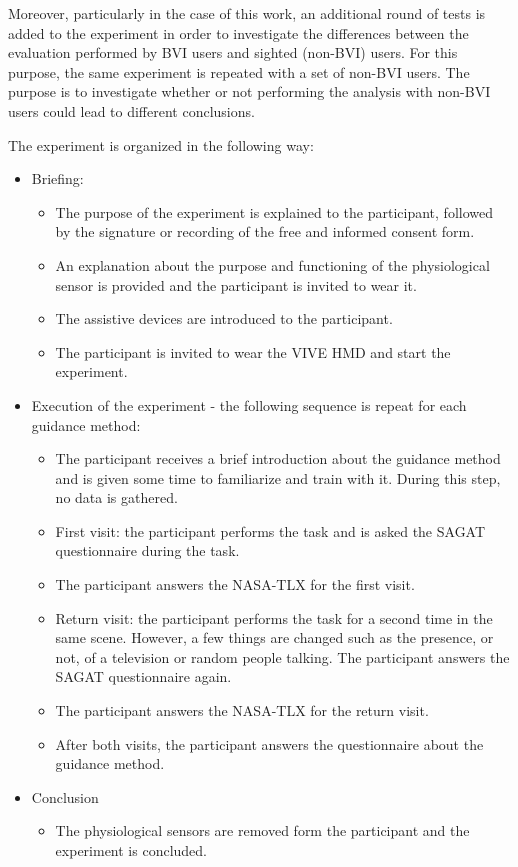 Moreover, particularly in the case of this work, an additional round of tests is added to the experiment in order to investigate the differences between the evaluation performed by BVI users and sighted (non-BVI) users. For this purpose, the same experiment is repeated with a set of non-BVI users. The purpose is to investigate whether or not performing the analysis with non-BVI users could lead to different conclusions.

The experiment is organized in the following way:

\begin{itemize}
    \item Briefing:
    \begin{itemize}
        \item The purpose of the experiment is explained to the participant, followed by the signature or recording of the free and informed consent form.
        \item An explanation about the purpose and functioning of the physiological sensor is provided and the participant is invited to wear it.
        \item The assistive devices are introduced to the participant.
        \item The participant is invited to wear the VIVE HMD and start the experiment. 
    \end{itemize}
    \item Execution of the experiment - the following sequence is repeat for each guidance method:
    \begin{itemize}
        \item The participant receives a brief introduction about the guidance method and is given some time to familiarize and train with it. During this step, no data is gathered. 
        \item First visit: the participant performs the task and is asked the SAGAT questionnaire during the task.
        \item The participant answers the NASA-TLX for the first visit.
        \item Return visit: the participant performs the task for a second time in the same scene. However, a few things are changed such as the presence, or not, of a television or random people talking. The participant answers the SAGAT questionnaire again.
        \item The participant answers the NASA-TLX for the return visit.
        \item After both visits, the participant answers the questionnaire about the guidance method.
    \end{itemize}
    \item Conclusion
    \begin{itemize}
        \item The physiological sensors are removed form the participant and the experiment is concluded.
    \end{itemize}
\end{itemize}

